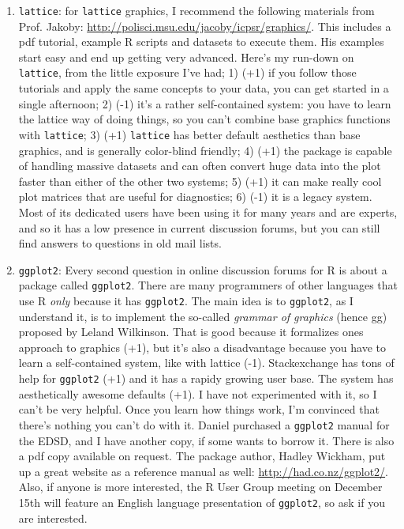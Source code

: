 \documentclass[a4paper]{article}
\begin{document}
\begin{enumerate}
\item{\texttt{lattice}}: for \texttt{lattice} graphics, I recommend the following materials from Prof. Jakoby: \url{http://polisci.msu.edu/jacoby/icpsr/graphics/}. This includes a pdf tutorial, example R scripts and datasets to execute them. His examples start easy and end up getting very advanced. Here's my run-down on \texttt{lattice}, from the little exposure I've had; 1) (+1) if you follow those tutorials and apply the same concepts to your data, you can get started in a single afternoon; 2) (-1) it's a rather self-contained system: you have to learn the lattice way of doing things, so you can't combine base graphics functions with \texttt{lattice}; 3) (+1) \texttt{lattice} has better default aesthetics than base graphics, and is generally color-blind friendly; 4) (+1) the package is capable of handling massive datasets and can often convert huge data into the plot faster than either of the other two systems; 5) (+1) it can make really cool plot matrices that are useful for diagnostics; 6) (-1) it is a legacy system. Most of its dedicated users have been using it for many years and are experts, and so it has a low presence in current discussion forums, but you can still find answers to questions in old mail lists.

\item{\texttt{ggplot2}}: Every second question in online discussion forums for R is about a package called \texttt{ggplot2}. There are many programmers of other languages that use R \textit{only} because it has \texttt{ggplot2}. The main idea is to \texttt{ggplot2}, as I understand it, is to implement the so-called \textit{grammar of graphics} (hence gg) proposed by Leland Wilkinson. That is good because it formalizes ones approach to graphics (+1), but it's also a disadvantage because you have to learn a self-contained system, like with lattice (-1). Stackexchange has tons of help for \texttt{ggplot2} (+1) and it has a rapidy growing user base. The system has aesthetically awesome defaults (+1). I have not experimented with it, so I can't be very helpful. Once you learn how things work, I'm convinced that there's nothing you can't do with it. Daniel purchased a \texttt{ggplot2} manual for the EDSD, and I have another copy, if some wants to borrow it. There is also a pdf copy available on request.  The package author, Hadley Wickham, put up a great website as a reference manual as well: \url{http://had.co.nz/ggplot2/}. Also, if anyone is more interested, the R User Group meeting on December 15th will feature an English language presentation of \texttt{ggplot2}, so ask if you are interested. 


\end{enumerate}
\end{document}
